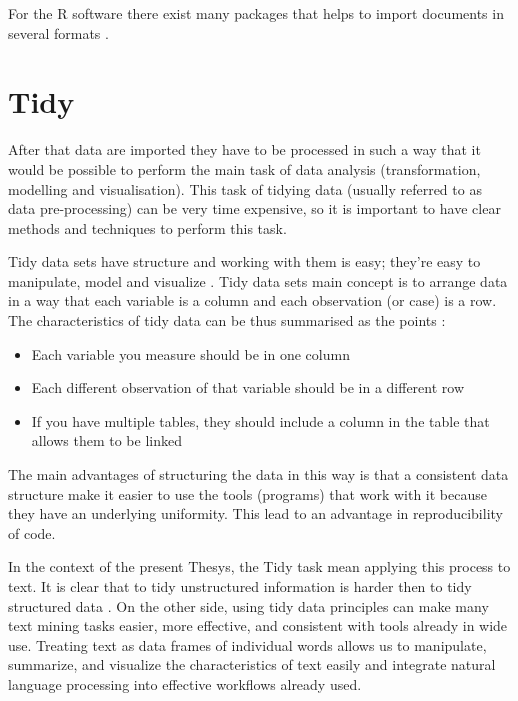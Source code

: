 \documentclass[b5paper,]{book}
\providecommand{\tightlist}{%
  \setlength{\itemsep}{0pt}\setlength{\parskip}{0pt}}
\theoremstyle{definition}
\theoremstyle{definition}
\theoremstyle{definition}
\theoremstyle{remark}
\begin{document}
For the R software there exist many packages that helps to import
documents in several formats \citep{readr2017r}.

\section{Tidy}\label{sotatoolstidy}

After that data are imported they have to be processed in such a way
that it would be possible to perform the main task of data analysis
(transformation, modelling and visualisation). This task of tidying data
(usually referred to as data pre-processing) can be very time expensive,
so it is important to have clear methods and techniques to perform this
task.

Tidy data sets have structure and working with them is easy; they're
easy to manipulate, model and visualize \citep{wickham2014tidy}. Tidy
data sets main concept is to arrange data in a way that each variable is
a column and each observation (or case) is a row. The characteristics of
tidy data can be thus summarised as the points \citep{leek2015elements}:

\begin{itemize}
\tightlist
\item
  Each variable you measure should be in one column
\item
  Each different observation of that variable should be in a different
  row
\item
  If you have multiple tables, they should include a column in the table
  that allows them to be linked
\end{itemize}

The main advantages of structuring the data in this way is that a
consistent data structure make it easier to use the tools (programs)
that work with it because they have an underlying uniformity. This lead
to an advantage in reproducibility of code.

In the context of the present Thesys, the Tidy task mean applying this
process to text. It is clear that to tidy unstructured information is
harder then to tidy structured data \citep{silge2016tidytext}. On the
other side, using tidy data principles can make many text mining tasks
easier, more effective, and consistent with tools already in wide use.
Treating text as data frames of individual words allows us to
manipulate, summarize, and visualize the characteristics of text easily
and integrate natural language processing into effective workflows
already used.
\end{document}
